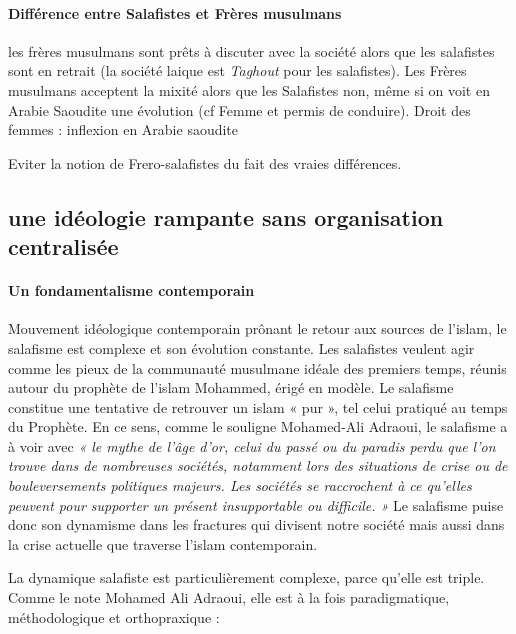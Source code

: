 \paragraph{Différence entre Salafistes et Frères musulmans}
les frères musulmans sont prêts à discuter avec la société alors que les salafistes sont en retrait  (la société laique est \emph{Taghout} pour les salafistes).
Les Frères musulmans acceptent la mixité 
alors que les Salafistes non, même si on voit en Arabie Saoudite une évolution (cf Femme et permis de conduire). Droit des femmes : inflexion en Arabie saoudite


Eviter la notion de Frero-salafistes du fait des vraies différences.



\subsection{une idéologie rampante sans organisation centralisée}



\paragraph{Un fondamentalisme
contemporain}


Mouvement idéologique contemporain prônant le retour aux sources de
l'islam, le salafisme est complexe et son évolution constante. Les
salafistes veulent agir comme les pieux de la communauté musulmane
idéale des premiers temps, réunis autour du prophète de l'islam
Mohammed, érigé en modèle. Le salafisme constitue une tentative de
retrouver un islam « pur », tel celui pratiqué au temps du Prophète. En
ce sens, comme le souligne Mohamed-Ali Adraoui, le salafisme a à voir
avec \emph{« le mythe de l'âge d'or, celui du passé ou du paradis perdu
que l'on trouve dans de nombreuses sociétés, notamment lors des
situations de crise ou de bouleversements politiques majeurs. Les
sociétés se raccrochent à ce qu'elles peuvent pour supporter un présent
insupportable ou difficile. »} Le salafisme puise donc son dynamisme
dans les fractures qui divisent notre société mais aussi dans la crise
actuelle que traverse l'islam contemporain.

La dynamique salafiste est particulièrement complexe, parce qu'elle est
triple. Comme le note Mohamed Ali Adraoui, elle est à la fois
paradigmatique, méthodologique et orthopraxique :


